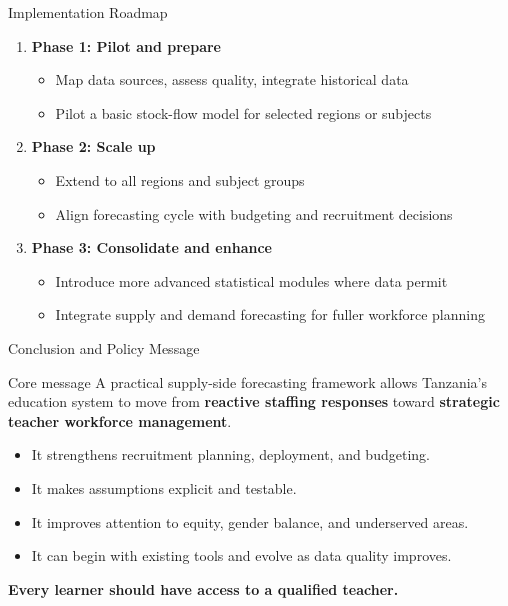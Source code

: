 \documentclass[
  11pt,
  ignorenonframetext,
  aspectratio=169,
  11pt]{beamer}
\newcommand{\highlight}[1]{\textcolor{DavidsonBlueDark}{\textbf{#1}}}
\newcommand{\gold}[1]{\textcolor{AccentGold}{\textbf{#1}}}
\begin{document}
\begin{frame}{Implementation Roadmap}
\begin{enumerate}
  \item \highlight{Phase 1: Pilot and prepare}
  \begin{itemize}
    \item Map data sources, assess quality, integrate historical data
    \item Pilot a basic stock-flow model for selected regions or subjects
  \end{itemize}
  \item \highlight{Phase 2: Scale up}
  \begin{itemize}
    \item Extend to all regions and subject groups
    \item Align forecasting cycle with budgeting and recruitment decisions
  \end{itemize}
  \item \highlight{Phase 3: Consolidate and enhance}
  \begin{itemize}
    \item Introduce more advanced statistical modules where data permit
    \item Integrate supply and demand forecasting for fuller workforce planning
  \end{itemize}
\end{enumerate}
\end{frame}

\begin{frame}{Conclusion and Policy Message}
\begin{block}{Core message}
\justifying
A practical supply-side forecasting framework allows Tanzania's education system to move from \highlight{reactive staffing responses} toward \highlight{strategic teacher workforce management}.
\end{block}
\vspace{0.15cm}
\begin{itemize}
  \item It strengthens recruitment planning, deployment, and budgeting.
  \item It makes assumptions explicit and testable.
  \item It improves attention to equity, gender balance, and underserved areas.
  \item It can begin with existing tools and evolve as data quality improves.
\end{itemize}
\vspace{0.2cm}
\centering
\Large\gold{Every learner should have access to a qualified teacher.}
\end{frame}
\end{document}
